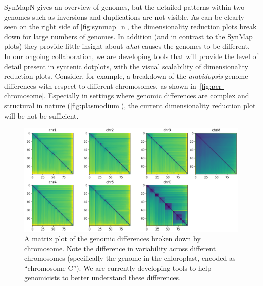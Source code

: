\documentclass{vgtc}                      %
\begin{document}
SynMapN gives an overview of genomes, but the detailed patterns within two genomes such as inversions and duplications are not visible.
As can be clearly seen on the right side of \autoref{fig:synmap_n}, the dimensionality reduction plots break down for large numbers of genomes. In addition (and in contrast to the SynMap plots) they provide little insight about \emph{what} causes the genomes to be different. In our ongoing collaboration, we are developing tools that will provide the level of detail present in syntenic dotplots, with the visual scalability of dimensionality reduction plots. Consider, for example, a breakdown of the \emph{arabidopsis} genome differences with respect to different chromosomes, as shown in~\autoref{fig:per-chromosome}. Especially in settings where genomic differences are complex and structural in nature (\autoref{fig:plasmodium}), the current dimensionality reduction plot will be not be sufficient.

\begin{figure}[t]
 \centering
 \includegraphics[width=\columnwidth]{chromosomes_matrix}
 \caption{A matrix plot of the genomic differences broken down by chromosome. Note the difference in variability across different chromosomes (specifically the genome in the chloroplast, encoded as ``chromosome C''). We are currently developing tools to help genomicists to better understand these differences.}
 \label{fig:per-chromosome}
\end{figure}
\end{document}

